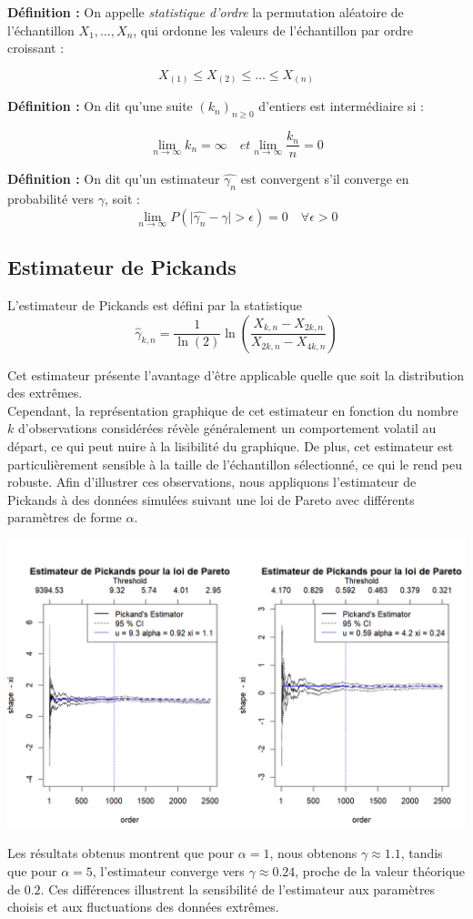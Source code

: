 \documentclass{article}
\begin{document}
\textbf{Définition :} On appelle \textit{statistique d'ordre} la permutation aléatoire de l'échantillon \(X_1, \dots, X_n\), qui ordonne les valeurs de l’échantillon par ordre croissant :

\[
X_{(1)} \leq X_{(2)} \leq \dots \leq X_{(n)}
\]

\textbf{Définition :} On dit qu'une suite \((k_n)_{n \geq 0}\) d'entiers est intermédiaire si :

\[
\lim_{n \to \infty} k_n = \infty \quad et \lim_{n \to \infty} \frac{k_n}{n} = 0
\]

\textbf{Définition :}
On dit qu'un estimateur \(\hat{\gamma_{n}}\) est convergent s'il converge en probabilité vers \(\gamma\), soit :
\[
\lim_{n \to \infty} P(\lvert \hat{\gamma_{n}} - \gamma \rvert > \epsilon) = 0 \quad \forall \epsilon > 0
\]
\subsection{Estimateur de Pickands}

L'estimateur de Pickands est défini par la statistique 
\[
\hat{\gamma}_{k,n} = \frac{1}{\ln(2)} \ln\left(\frac{X_{k,n} - X_{2k,n}}{X_{2k,n} - X_{4k,n}}\right)
\]

Cet estimateur présente l'avantage d'être applicable quelle que soit la distribution des extrêmes. \\

Cependant, la représentation graphique de cet estimateur en fonction du nombre \(k\) d'observations considérées révèle généralement un comportement volatil au départ, ce qui peut nuire à la lisibilité du graphique. De plus, cet estimateur est particulièrement sensible à la taille de l'échantillon sélectionné, ce qui le rend peu robuste.
Afin d'illustrer ces observations, nous appliquons l'estimateur de Pickands à des données simulées suivant une loi de Pareto avec différents paramètres de forme \(\alpha\).
\begin{center}
	\includegraphics[scale=0.6]{./images/estimateur_pickands_pareto.png} 
\end{center}
Les résultats obtenus montrent que pour \( \alpha = 1\), nous obtenons \(\gamma \approx 1.1\), tandis que pour \(\alpha = 5\), l'estimateur converge vers \(\gamma \approx 0.24\), proche de la valeur théorique de \(0.2\). Ces différences illustrent la sensibilité de l'estimateur aux paramètres choisis et aux fluctuations des données extrêmes.  \\
\end{document}
